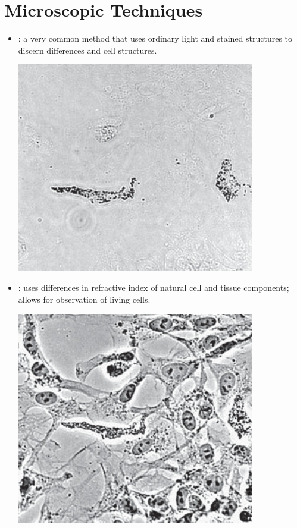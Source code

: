 \section{Microscopic Techniques}
\begin{itemize}
  \item {}: a very common method that uses ordinary light and stained structures to discern differences and cell structures. 
  \begin{center}
    \includegraphics[scale=0.45]{images/week-1-1a.jpg}
  \end{center}
  \item {}: uses differences in refractive index of natural cell and tissue components; allows for observation of living cells.
  \begin{center}
    \includegraphics[scale=0.45]{images/week-1-1b.jpg}

\end{center}
\end{itemize}
